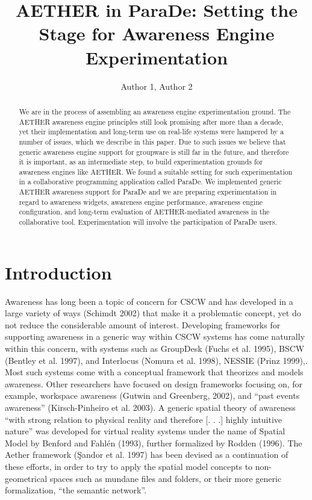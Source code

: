 \documentclass{ecscw2007}
\title{AETHER in ParaDe: Setting the Stage for Awareness Engine Experimentation}
\author{Author 1, Author 2}
\affiliation{Institute 1, Country, Institute 2, Country}
\begin{document}
\maketitle
\thispagestyle{empty}


\begin{abstract}
We are in the process of assembling an awareness engine experimentation ground. The AETHER awareness engine principles still look promising after more than a decade, yet their implementation and long-term use on real-life systems were hampered by a number of issues, which we describe in this paper. Due to such issues we believe that generic awareness engine support for groupware is still far in the future, and therefore it is important, as an intermediate step, to build experimentation grounds for awareness engines like AETHER. We found a suitable setting for such experimentation in a collaborative programming application called ParaDe. We implemented generic AETHER awareness support for ParaDe and we are preparing experimentation in regard to awareness widgets, awareness engine performance, awareness engine configuration, and long-term evaluation of AETHER-mediated awareness in the collaborative tool. Experimentation will involve the participation of ParaDe users.
\end{abstract}

\section*{Introduction}
Awareness has long been a topic of concern for CSCW and has developed in a large variety of ways (Schimdt 2002) that make it a problematic concept, yet do not reduce the considerable amount of interest. Developing frameworks for supporting awareness in a generic way within CSCW systems has come naturally within this concern, with systems such as GroupDesk (Fuchs et al. 1995), BSCW (Bentley et al. 1997), and Interlocus (Nomura et al. 1998), NESSIE (Prinz 1999),. Most such systems come with a conceptual framework that theorizes and models awareness. Other researchers have focused on design frameworks focusing on, for example, workspace awareness (Gutwin and Greenberg, 2002), and ``past events awareness'' (Kirsch-Pinheiro et al. 2003). A generic spatial theory of awareness ``with strong relation to physical reality and therefore [. . .] highly intuitive nature'' was developed for virtual reality systems under the name of Spatial Model by Benford and Fahl\'{e}n (1993), further formalized by Rodden (1996). The Aether framework (Şandor et al. 1997) has been devised as a continuation of these efforts, in order to try to apply the spatial model concepts to non-geometrical spaces such as mundane files and folders, or their more generic formalization, ``the semantic network''.  
\end{document}
